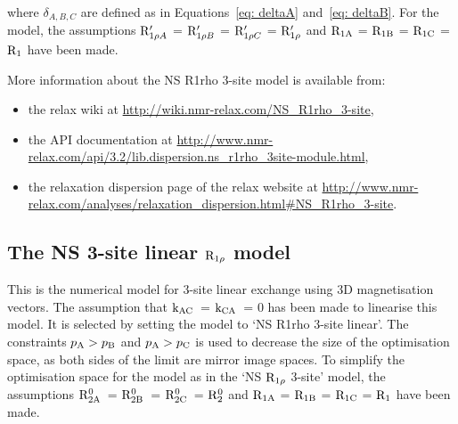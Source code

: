 where $\delta_{A,B,C}$ are defined as in Equations~\ref{eq: deltaA} and~\ref{eq: deltaB}.
For the model, the assumptions $\mathrm{R}_{1\rho A}'$ = $\mathrm{R}_{1\rho B}'$ = $\mathrm{R}_{1\rho C}'$ = $\mathrm{R}_{1\rho}'$ and $\mathrm{R}_{\textrm{1A}}$ = $\mathrm{R}_{\textrm{1B}}$ = $\mathrm{R}_{\textrm{1C}}$ = $\mathrm{R}_1$ have been made.

More information about the NS R1rho 3-site model is available from:
\begin{itemize}
  \item the relax wiki at \url{http://wiki.nmr-relax.com/NS\_R1rho\_3-site},
  \item the API documentation at \url{http://www.nmr-relax.com/api/3.2/lib.dispersion.ns\_r1rho\_3site-module.html},
  \item the relaxation dispersion page of the relax website at \url{http://www.nmr-relax.com/analyses/relaxation\_dispersion.html#NS\_R1rho\_3-site}.
\end{itemize}



\subsection{The NS 3-site linear $\mathrm{R}_{1\rho}$ model}
\label{sect: dispersion: NS R1rho 3-site linear model}

This is the numerical model for 3-site linear exchange using 3D magnetisation vectors.
The assumption that $\textrm{k}_{\textrm{AC}}$~= $\textrm{k}_{\textrm{CA}}$~= 0 has been made to linearise this model.
It is selected by setting the model to `NS R1rho 3-site linear'.
The constraints $p_{\textrm{A}} > p_{\textrm{B}}$ and $p_{\textrm{A}} > p_{\textrm{C}}$ is used to decrease the size of the optimisation space, as both sides of the limit are mirror image spaces.
To simplify the optimisation space for the model as in the `NS $\mathrm{R}_{1\rho}$ 3-site' model, the assumptions $\mathrm{R}_{\mathrm{2A}}^0$~= $\mathrm{R}_{\mathrm{2B}}^0$~= $\mathrm{R}_{\mathrm{2C}}^0$~= $\mathrm{R}_2^0$ and $\mathrm{R}_{\textrm{1A}}$ = $\mathrm{R}_{\textrm{1B}}$ = $\mathrm{R}_{\textrm{1C}}$ = $\mathrm{R}_1$ have been made.

